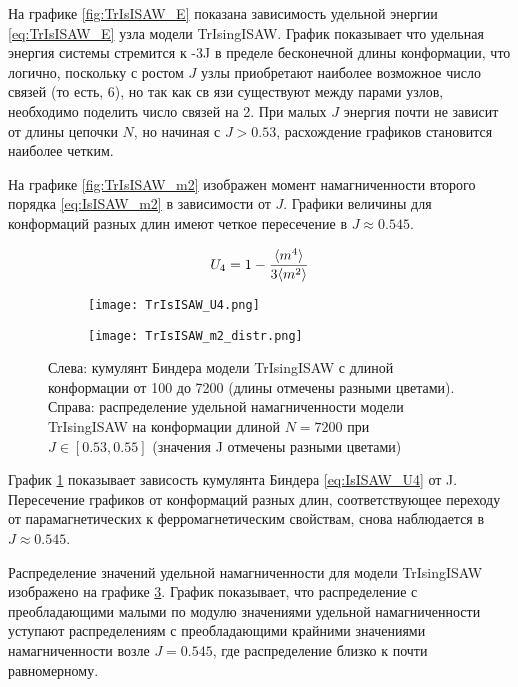 На графике \ref{fig:TrIsISAW_E} показана зависимость удельной энергии \eqref{eq:TrIsISAW_E} узла модели TrIsingISAW.
График показывает что удельная энергия системы стремится к -3J в пределе бесконечной длины конформации, 
что логично, поскольку с ростом $J$ узлы приобретают наиболее возможное число связей (то есть, 6), но так как св
язи существуют между парами узлов,
необходимо поделить число связей на 2.
При малых $J$ энергия почти не зависит от длины цепочки $N$, но начиная с $J > 0.53$, расхождение графиков становится наиболее четким.

На графике \ref{fig:TrIsISAW_m2} изображен момент намагниченности второго порядка \eqref{eq:IsISAW_m2} в зависимости от $J$.
Графики величины для конформаций разных длин имеют четкое пересечение в $J \approx 0.545$.

\begin{equation}
\label{eq:IsISAW_U4}
	U_4 = 1 - \frac{\langle m^4 \rangle}{3 \langle m^2 \rangle}
\end{equation}

\begin{figure}[h]
\begin{subfigure}{0.49\textwidth}
\texttt{[image: TrIsISAW\_U4.png]}
\label{fig:TrIsISAW_U4}
\end{subfigure}
\hfill
\begin{subfigure}{0.49\textwidth}
\texttt{[image: TrIsISAW\_m2\_distr.png]}
\label{fig:TrIsISAW_m2_distr}
\end{subfigure}
\caption{Слева: кумулянт Биндера модели TrIsingISAW с длиной конформации от 100 до 7200 (длины отмечены разными цветами).
Справа: распределение удельной намагниченности модели TrIsingISAW на конформации длиной $N=7200$ при $J \in [0.53,0.55]$ (значения J отмечены разными цветами)}
\end{figure}


График \ref{fig:TrIsISAW_U4} показывает зависость кумулянта Биндера \eqref{eq:IsISAW_U4} от J. 
Пересечение графиков от конформаций разных длин, соответствующее переходу от парамагнетических к ферромагнетическим свойствам, снова наблюдается в $J \approx 0.545$.

Распределение значений удельной намагниченности для модели TrIsingISAW изображено на графике \ref{fig:TrIsISAW_m2_distr}.
График показывает, что распределение с преобладающими малыми по модулю значениями удельной намагниченности уступают 
распределениям с преобладающими крайними значениями намагниченности возле $J=0.545$, где распределение близко к почти равномерному.


